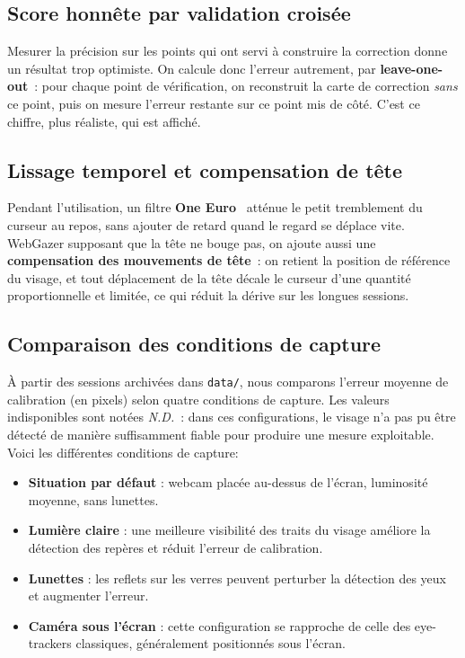 \documentclass[11pt,a4paper]{article}
\newcommand{\code}[1]{\texttt{\small #1}}
\begin{document}
\subsection{Score honnête par validation croisée}

Mesurer la précision sur les points qui ont servi à construire la correction donne un
résultat trop optimiste. On calcule donc l'erreur autrement, par
\textbf{leave-one-out}~: pour chaque point de vérification, on reconstruit la carte de
correction \emph{sans} ce point, puis on mesure l'erreur restante sur ce point mis de
côté. C'est ce chiffre, plus réaliste, qui est affiché.

\subsection{Lissage temporel et compensation de tête}

Pendant l'utilisation, un filtre \textbf{One Euro}~\cite{casiez2012} atténue le petit
tremblement du curseur au repos, sans ajouter de retard quand le regard se déplace
vite. WebGazer supposant que la tête ne bouge pas, on ajoute aussi une
\textbf{compensation des mouvements de tête}~: on retient la position de référence du
visage, et tout déplacement de la tête décale le curseur d'une quantité proportionnelle
et limitée, ce qui réduit la dérive sur les longues sessions.

\subsection{Comparaison des conditions de capture}
À partir des sessions archivées dans \code{data/}, nous comparons l'erreur moyenne de calibration (en pixels) selon quatre conditions de capture. Les valeurs indisponibles sont notées \textit{N.D.}~: dans ces configurations, le visage n'a pas pu être détecté de manière suffisamment fiable pour produire une mesure exploitable.
\newline
Voici les différentes conditions de capture:
\begin{itemize}
    \item \textbf{Situation par défaut} : webcam placée au-dessus de l'écran, luminosité moyenne, sans lunettes.
    \item \textbf{Lumière claire} : une meilleure visibilité des traits du visage améliore la détection des repères et réduit l'erreur de calibration.
    \item \textbf{Lunettes} : les reflets sur les verres peuvent perturber la détection des yeux et augmenter l'erreur.
    \item \textbf{Caméra sous l'écran} : cette configuration se rapproche de celle des eye-trackers classiques, généralement positionnés sous l'écran.
\end{itemize}
\end{document}

